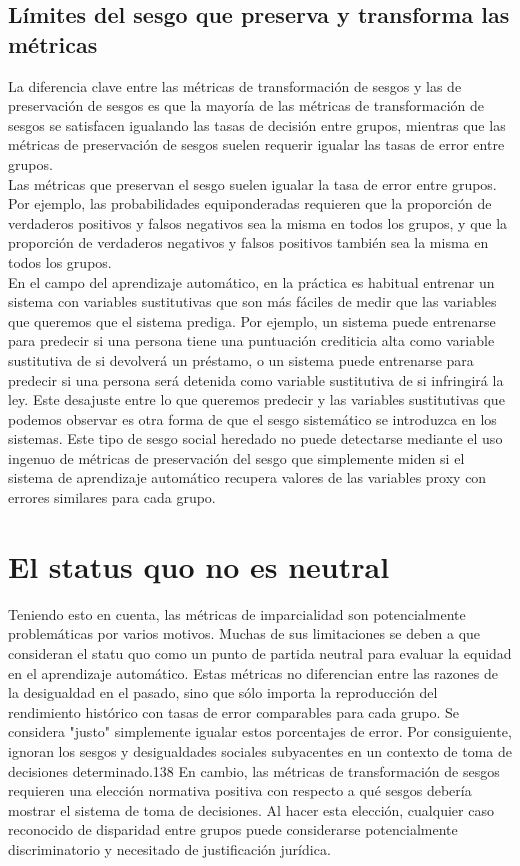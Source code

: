 \subsection{Límites del sesgo que preserva y transforma las métricas}
La diferencia clave entre las métricas de transformación de sesgos y las de preservación de sesgos es que la mayoría de las métricas de transformación de sesgos se satisfacen igualando las tasas de decisión entre grupos, mientras que las métricas de preservación de sesgos suelen requerir igualar las tasas de error entre grupos.\\

Las métricas que preservan el sesgo suelen igualar la tasa de error entre grupos. Por ejemplo, las probabilidades equiponderadas requieren que la proporción de verdaderos positivos y falsos negativos sea la misma en todos los grupos, y que la proporción de verdaderos negativos y falsos positivos también sea la misma en todos los grupos.\\

En el campo del aprendizaje automático, en la práctica es habitual entrenar un sistema con variables sustitutivas que son más fáciles de medir que las variables que queremos que el sistema prediga. Por ejemplo, un sistema puede entrenarse para predecir si una persona tiene una puntuación crediticia alta como variable sustitutiva de si devolverá un préstamo, o un sistema puede entrenarse para predecir si una persona será detenida como variable sustitutiva de si infringirá la ley. Este desajuste entre lo que queremos predecir y las variables sustitutivas que podemos observar es otra forma de que el sesgo sistemático se introduzca en los sistemas. Este tipo de sesgo social heredado no puede detectarse mediante el uso ingenuo de métricas de preservación del sesgo que simplemente miden si el sistema de aprendizaje automático recupera valores de las variables proxy con errores similares para cada grupo.\\


\section{El status quo no es neutral}

Teniendo esto en cuenta, las métricas de imparcialidad son potencialmente problemáticas por varios motivos. Muchas de sus limitaciones se deben a que consideran el statu quo como un punto de partida neutral para evaluar la equidad en el aprendizaje automático. Estas métricas no diferencian entre las razones de la desigualdad en el pasado, sino que sólo importa la reproducción del rendimiento histórico con tasas de error comparables para cada grupo. Se considera "justo" simplemente igualar estos porcentajes de error. Por consiguiente, ignoran los sesgos y desigualdades sociales subyacentes en un contexto de toma de decisiones determinado.138 En cambio, las métricas de transformación de sesgos requieren una elección normativa positiva con respecto a qué sesgos debería mostrar el sistema de toma de decisiones. Al hacer esta elección, cualquier caso reconocido de disparidad entre grupos puede considerarse potencialmente discriminatorio y necesitado de justificación jurídica.\\

